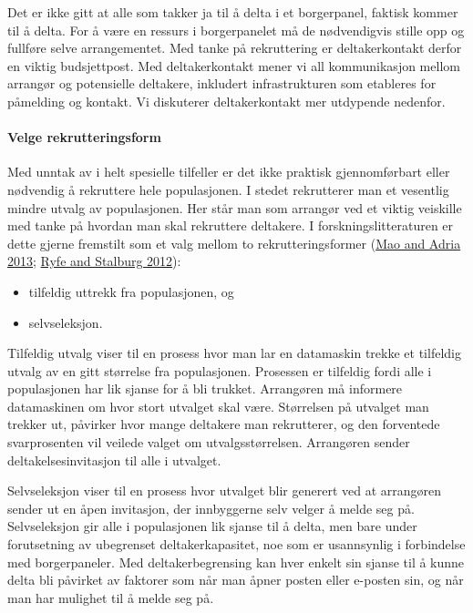 \documentclass[
  12pt,
  a4paper, 12pt]{article}
\providecommand{\tightlist}{%
  \setlength{\itemsep}{0pt}\setlength{\parskip}{0pt}}
\begin{document}
Det er ikke gitt at alle som takker ja til å delta i et borgerpanel, faktisk kommer til å delta. For å være en ressurs i borgerpanelet må de nødvendigvis stille opp og fullføre selve arrangementet. Med tanke på rekruttering er deltakerkontakt derfor en viktig budsjettpost. Med deltakerkontakt mener vi all kommunikasjon mellom arrangør og potensielle deltakere, inkludert infrastrukturen som etableres for påmelding og kontakt. Vi diskuterer deltakerkontakt mer utdypende nedenfor.

\hypertarget{velge-rekrutteringsform}{%
\paragraph{Velge rekrutteringsform}\label{velge-rekrutteringsform}}

Med unntak av i helt spesielle tilfeller er det ikke praktisk gjennomførbart eller nødvendig å rekruttere hele populasjonen. I stedet rekrutterer man et vesentlig mindre utvalg av populasjonen. Her står man som arrangør ved et viktig veiskille med tanke på hvordan man skal rekruttere deltakere. I forskningslitteraturen er dette gjerne fremstilt som et valg mellom to rekrutteringsformer (\protect\hyperlink{ref-mao_deciding_2013}{Mao and Adria 2013}; \protect\hyperlink{ref-ryfe_participation_2012}{Ryfe and Stalburg 2012}):

\begin{itemize}
\tightlist
\item
  tilfeldig uttrekk fra populasjonen, og\\
\item
  selvseleksjon.
\end{itemize}

Tilfeldig utvalg viser til en prosess hvor man lar en datamaskin trekke et tilfeldig utvalg av en gitt størrelse fra populasjonen. Prosessen er tilfeldig fordi alle i populasjonen har lik sjanse for å bli trukket. Arrangøren må informere datamaskinen om hvor stort utvalget skal være. Størrelsen på utvalget man trekker ut, påvirker hvor mange deltakere man rekrutterer, og den forventede svarprosenten vil veilede valget om utvalgsstørrelsen. Arrangøren sender deltakelsesinvitasjon til alle i utvalget.

Selvseleksjon viser til en prosess hvor utvalget blir generert ved at arrangøren sender ut en åpen invitasjon, der innbyggerne selv velger å melde seg på. Selvseleksjon gir alle i populasjonen lik sjanse til å delta, men bare under forutsetning av ubegrenset deltakerkapasitet, noe som er usannsynlig i forbindelse med borgerpaneler. Med deltakerbegrensing kan hver enkelt sin sjanse til å kunne delta bli påvirket av faktorer som når man åpner posten eller e-posten sin, og når man har mulighet til å melde seg på.
\end{document}
